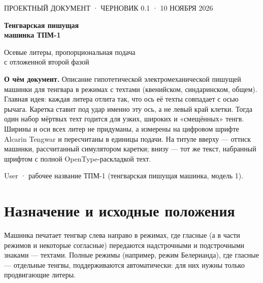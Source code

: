 \documentclass[11pt,a4paper]{article}
\newlength\tgem \setlength\tgem{5mm}
\newcommand\tgu{0.001\tgem}
\begin{document}
\begin{titlepage}
\vspace*{18mm}
{\sffamily\small ПРОЕКТНЫЙ ДОКУМЕНТ · ЧЕРНОВИК 0.1 · 10 НОЯБРЯ 2026}\par
\vspace{8mm}
{\sffamily\bfseries\fontsize{26}{30}\selectfont Тенгварская пишущая\\[2pt] машинка ТПМ-1}\par
\vspace{4mm}
{\large Осевые литеры, пропорциональная подача\\ с отложенной второй фазой}\par
\vspace{14mm}
\begin{center}
\setlength\tgem{15mm}
\begin{tikzpicture}[x=\tgu,y=\tgu]

\end{tikzpicture}
\end{center}
\vspace{6mm}
\noindent\begin{minipage}{0.86\textwidth}\small
\textbf{О чём документ.} Описание гипотетической электромеханической пишущей машинки для тенгвара в режимах с техтами (квенийском, синдаринском, общем). Главная идея: каждая литера отлита так, что ось её техты совпадает с осью рычага. Каретка ставит под удар именно эту ось, а не левый край клетки. Тогда один набор мёртвых техт годится для узких, широких и «смещённых» тенгв. Ширины и оси всех литер не придуманы, а измерены на цифровом шрифте Alcarin Tengwar и пересчитаны в единицы подачи. На титуле вверху — оттиск машинки, рассчитанный симулятором каретки; внизу — тот же текст, набранный шрифтом с полной OpenType-раскладкой техт.
\end{minipage}
\vfill
{\small User · рабочее название ТПМ-1 (тенгварская пишущая машинка, модель 1).}
\end{titlepage}

\tableofcontents
\newpage

\section{Назначение и исходные положения}

Машинка печатает тенгвар слева направо в режимах, где гласные (а в части режимов и некоторые согласные) передаются надстрочными и подстрочными знаками — техтами. Полные режимы (например, режим Белерианда), где гласные — отдельные тенгвы, поддерживаются автоматически: для них нужны только продвигающие литеры.
\end{document}
